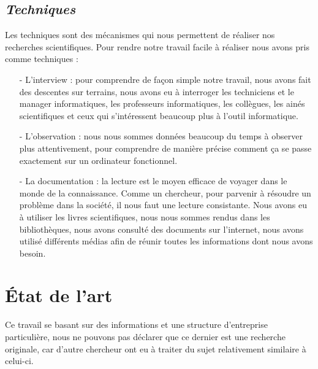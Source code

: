 \documentclass[a4paper,12pt,oneside]{book}
\begin{document}
            \subsection[Techniques]{\textit{Techniques}}
            Les techniques sont des mécanismes qui nous permettent de réaliser nos recherches
            scientifiques. Pour rendre notre travail facile à réaliser nous avons pris comme techniques : 
            \newline
            \begin{itemize}
                \item [-] L'interview : pour comprendre de façon simple notre travail, nous avons fait des
                descentes sur terrains, nous avons eu à interroger les techniciens et le manager
                informatiques, les professeurs informatiques, les collègues, les ainés scientifiques
                et ceux qui s’intéressent beaucoup plus à l’outil informatique.
                \newline
                \item [-] L'observation : nous nous sommes données beaucoup du temps à observer plus
                attentivement, pour comprendre de manière précise comment ça se passe exactement sur un ordinateur fonctionnel.
                \newline
                \item [-] La documentation : la lecture est le moyen efficace de voyager dans le monde
                de la connaissance. Comme un chercheur, pour parvenir à résoudre un problème
                dans la société, il nous faut une lecture consistante. Nous avons eu à utiliser les
                livres scientifiques, nous nous sommes rendus dans les bibliothèques, nous avons
                consulté des documents sur l’internet, nous avons utilisé différents médias afin de
                réunir toutes les informations dont nous avons besoin.
            \end{itemize}
            

        \section[Etat de l'art]{État de l’art}
        Ce travail se basant sur des informations et une structure d’entreprise particulière, nous ne
        pouvons pas déclarer que ce dernier est une recherche originale, car d’autre chercheur ont eu
        à traiter du sujet relativement similaire à celui-ci.
        \newline
\end{document}
